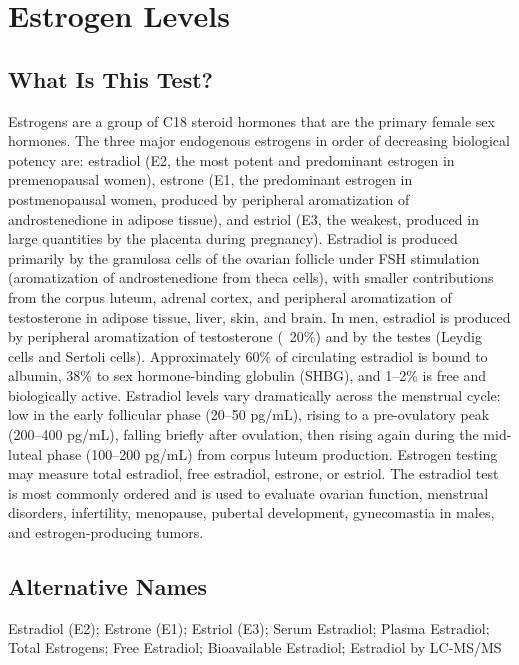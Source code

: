 \chapter{Estrogen Levels}

\section*{What Is This Test?}
Estrogens are a group of C18 steroid hormones that are the primary female sex hormones. The three major endogenous estrogens in order of decreasing biological potency are: estradiol (E2, the most potent and predominant estrogen in premenopausal women), estrone (E1, the predominant estrogen in postmenopausal women, produced by peripheral aromatization of androstenedione in adipose tissue), and estriol (E3, the weakest, produced in large quantities by the placenta during pregnancy). Estradiol is produced primarily by the granulosa cells of the ovarian follicle under FSH stimulation (aromatization of androstenedione from theca cells), with smaller contributions from the corpus luteum, adrenal cortex, and peripheral aromatization of testosterone in adipose tissue, liver, skin, and brain. In men, estradiol is produced by peripheral aromatization of testosterone (~20\%) and by the testes (Leydig cells and Sertoli cells). Approximately 60\% of circulating estradiol is bound to albumin, 38\% to sex hormone-binding globulin (SHBG), and 1--2\% is free and biologically active. Estradiol levels vary dramatically across the menstrual cycle: low in the early follicular phase (20--50 pg/mL), rising to a pre-ovulatory peak (200--400 pg/mL), falling briefly after ovulation, then rising again during the mid-luteal phase (100--200 pg/mL) from corpus luteum production. Estrogen testing may measure total estradiol, free estradiol, estrone, or estriol. The estradiol test is most commonly ordered and is used to evaluate ovarian function, menstrual disorders, infertility, menopause, pubertal development, gynecomastia in males, and estrogen-producing tumors.

\section*{Alternative Names}
Estradiol (E2); Estrone (E1); Estriol (E3); Serum Estradiol; Plasma Estradiol; Total Estrogens; Free Estradiol; Bioavailable Estradiol; Estradiol by LC-MS/MS

